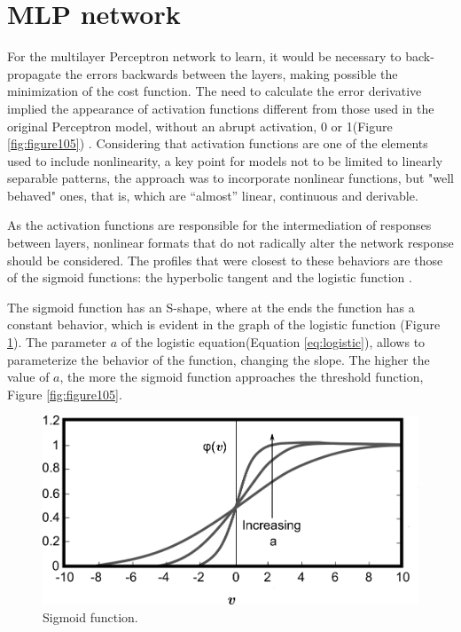 \section{MLP network}

For the multilayer Perceptron network to learn, it would be necessary to back-propagate the errors backwards between the layers, making possible the minimization of the cost function. The need to calculate the error derivative implied the appearance of activation functions different from those used in the original Perceptron model, without an abrupt activation, 0 or 1(Figure \ref{fig:figure105}) \cite{haykin1999}.  Considering that activation functions are one of the elements used to include nonlinearity, a key point for models not to be limited to linearly separable patterns, the approach was to incorporate nonlinear functions, but "well behaved" ones, that is, which are “almost” linear, continuous and derivable.

As the activation functions are responsible for the intermediation of responses between layers, nonlinear formats that do not radically alter the network response should be considered. The profiles that were closest to these behaviors are those of the sigmoid functions: the hyperbolic tangent and the logistic function \cite{rateke1999}.

The sigmoid function has an S-shape, where at the ends the function has a constant behavior, which is evident in the graph of the logistic function (Figure \ref{fig:figure107}). The parameter $a$ of the logistic equation(Equation \ref{eq:logistic}), allows to parameterize the behavior of the function, changing the slope. The higher the value of $a$, the more the sigmoid function approaches the threshold function, Figure \ref{fig:figure105}.

\begin{figure}
    \centering
    \includegraphics[scale=0.55]{"Part 3 - Learning Systems/Supervised Learning/Deep Learning/images/figure107.png"}
    \caption{Sigmoid function.}
    \label{fig:figure107}
\end{figure}

